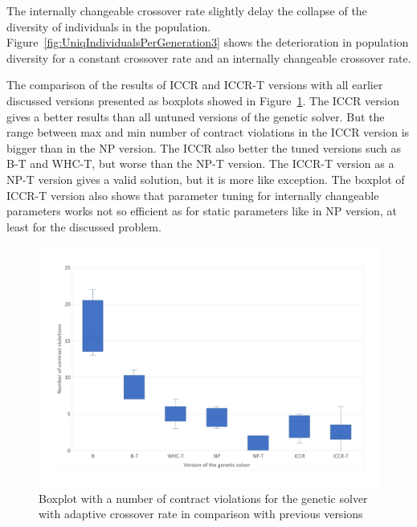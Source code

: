 The internally changeable crossover rate slightly delay the collapse of the diversity of individuals in the population. Figure~\ref{fig:UniqIndividualsPerGeneration3} shows the deterioration in population diversity for a constant crossover rate and an internally changeable crossover rate.


The comparison of the results of ICCR and ICCR-T versions with all earlier discussed versions presented as boxplots showed in Figure~\ref{fig:boxplotsolverAdaptiveCrossoverTuning}. The ICCR version gives a better results than all untuned versions of the genetic solver. But the range between max and min number of contract violations in the ICCR version is bigger than in the NP version.
The ICCR also better the tuned versions such as B-T and WHC-T, but worse than the NP-T version. The ICCR-T version as a NP-T version gives a valid solution, but it is more like exception. The boxplot of ICCR-T version also shows that parameter tuning for internally changeable parameters works not so efficient as for static parameters like in NP version, at least for the discussed problem. 

\begin{figure}
	\centering
	\includegraphics[width=\textwidth]{images/BoxPlotSolverAdaptiveCrossoverTuning.pdf}
	\caption[Boxplot with a number of contract violations for the genetic solver with adaptive crossover rate in comparison with previous versions]{Boxplot with a number of contract violations for the genetic solver with adaptive crossover rate in comparison with previous versions}
	\label{fig:boxplotsolverAdaptiveCrossoverTuning}
\end{figure}


